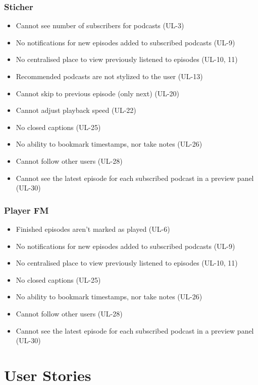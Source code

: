\documentclass[12pt]{article}
\begin{document}
\subsubsection{Sticher\cite{sticher}}

\begin{itemize}
    \item Cannot see number of subscribers for podcasts (UL-3)
    \item No notifications for new episodes added to subscribed podcasts (UL-9)
    \item No centralised place to view previously listened to episodes (UL-10, 11)
    \item Recommended podcasts are not stylized to the user (UL-13)
    \item Cannot skip to previous episode (only next) (UL-20)
    \item Cannot adjust playback speed (UL-22)
    \item No closed captions (UL-25)
    \item No ability to bookmark timestamps, nor take notes (UL-26)
    \item Cannot follow other users (UL-28)
    \item Cannot see the latest episode for each subscribed podcast in a preview panel (UL-30)
\end{itemize}

\subsubsection{Player FM\cite{player_fm}}
\begin{itemize}
    \item Finished episodes aren’t marked as played (UL-6)
    \item No notifications for new episodes added to subscribed podcasts (UL-9)
    \item No centralised place to view previously listened to episodes (UL-10, 11)
    \item No closed captions (UL-25)
    \item No ability to bookmark timestamps, nor take notes (UL-26)
    \item Cannot follow other users (UL-28)
    \item Cannot see the latest episode for each subscribed podcast in a preview panel (UL-30)
\end{itemize}


\section{User Stories}
\end{document}
